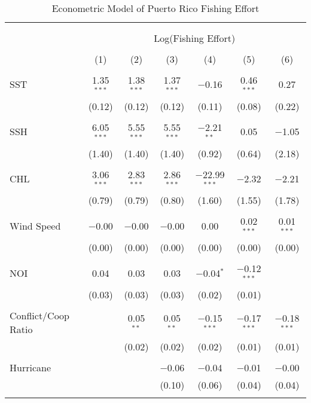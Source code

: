 \documentclass[10pt]{article}
\begin{document}
\begin{table}[!htbp] \centering 
  \caption{Econometric Model of Puerto Rico Fishing Effort} 
  \label{} 
\footnotesize 
\begin{tabular}{@{\extracolsep{5pt}}lcccccc} 
\\[-1.8ex]\hline 
\hline \\[-1.8ex] 
\\[-1.8ex] & \multicolumn{6}{c}{Log(Fishing Effort)} \\ 
\\[-1.8ex] & (1) & (2) & (3) & (4) & (5) & (6)\\ 
\hline \\[-1.8ex] 
 SST & 1.35$^{***}$ & 1.38$^{***}$ & 1.37$^{***}$ & $-$0.16 & 0.46$^{***}$ & 0.27 \\ 
  & (0.12) & (0.12) & (0.12) & (0.11) & (0.08) & (0.22) \\ 
  & & & & & & \\ 
 SSH & 6.05$^{***}$ & 5.55$^{***}$ & 5.55$^{***}$ & $-$2.21$^{**}$ & 0.05 & $-$1.05 \\ 
  & (1.40) & (1.40) & (1.40) & (0.92) & (0.64) & (2.18) \\ 
  & & & & & & \\ 
 CHL & 3.06$^{***}$ & 2.83$^{***}$ & 2.86$^{***}$ & $-$22.99$^{***}$ & $-$2.32 & $-$2.21 \\ 
  & (0.79) & (0.79) & (0.80) & (1.60) & (1.55) & (1.78) \\ 
  & & & & & & \\ 
 Wind Speed & $-$0.00 & $-$0.00 & $-$0.00 & 0.00 & 0.02$^{***}$ & 0.01$^{***}$ \\ 
  & (0.00) & (0.00) & (0.00) & (0.00) & (0.00) & (0.00) \\ 
  & & & & & & \\ 
 NOI & 0.04 & 0.03 & 0.03 & $-$0.04$^{*}$ & $-$0.12$^{***}$ &  \\ 
  & (0.03) & (0.03) & (0.03) & (0.02) & (0.01) &  \\ 
  & & & & & & \\ 
 Conflict/Coop Ratio &  & 0.05$^{**}$ & 0.05$^{**}$ & $-$0.15$^{***}$ & $-$0.17$^{***}$ & $-$0.18$^{***}$ \\ 
  &  & (0.02) & (0.02) & (0.02) & (0.01) & (0.01) \\ 
  & & & & & & \\ 
 Hurricane &  &  & $-$0.06 & $-$0.04 & $-$0.01 & $-$0.00 \\ 
  &  &  & (0.10) & (0.06) & (0.04) & (0.04) \\ 
  & & & & & & \\ 

\end{tabular}
\end{table}
\end{document}
